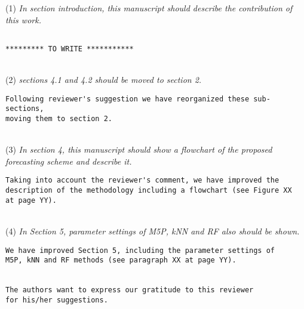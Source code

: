 \documentclass[preprint]{elsarticle}
\begin{document}
\noindent (1) \emph{In section introduction, this manuscript should describe the contribution of this work. } 

\begin{verbatim}

********* TO WRITE ***********

\end{verbatim}


~\\
\noindent (2) \emph{sections 4.1 and 4.2 should be moved to section 2. } 

\begin{verbatim}
Following reviewer's suggestion we have reorganized these sub-sections, 
moving them to section 2.
\end{verbatim}


~\\
\noindent (3) \emph{In section 4, this manuscript should show a flowchart of the proposed forecasting scheme and describe it. } 

\begin{verbatim}
Taking into account the reviewer's comment, we have improved the 
description of the methodology including a flowchart (see Figure XX 
at page YY).
\end{verbatim}


~\\
\noindent (4) \emph{In Section 5, parameter settings of 
M5P, kNN and RF also should be shown. } 

\begin{verbatim}
We have improved Section 5, including the parameter settings of 
M5P, kNN and RF methods (see paragraph XX at page YY).


The authors want to express our gratitude to this reviewer 
for his/her suggestions.
\end{verbatim}
\end{document}
